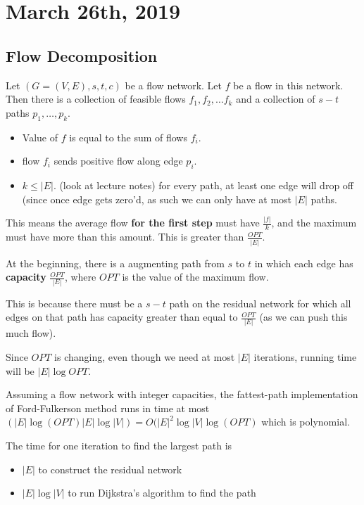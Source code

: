 \documentclass[../main/main.tex]{subfiles}
\begin{document}
\section{March 26th, 2019}
\subsection{Flow Decomposition}

\begin{lemma}
	Let $\left( G=(V,E),s,t,c \right) $ be a flow network. Let $f$ be a flow in this network. Then there is a collection of feasible flows  $f_1,f_2,\ldots f_k$ and a collection of $s-t$ paths $p_1,\ldots,p_k$.
\end{lemma}
\begin{itemize}
	\item Value of $f$ is equal to the sum of flows $f_i$.
	\item flow $f_i$ sends positive flow along edge $p_i$.
	\item  $k\le |E|$. (look at lecture notes) for every path, at least one edge will drop off (since once edge gets zero'd, as such we can only have at most $|E|$ paths.
\end{itemize}

This means the average flow \textbf{for the first step} must have $\frac{|f|}{k}$, and the maximum must have more than this amount. This is greater than $\frac{OPT}{|E|}$.

\begin{corollary}
	\label{begMinEdgeCap}
	At the beginning, there is a augmenting path from $s$ to $t$ in which each edge has \textbf{capacity} $\frac{OPT}{|E|}$, where $OPT$ is the value of the maximum flow.
\end{corollary}

This is because there must be a $s-t$ path on the residual network for which all edges on that path has capacity greater than equal to $\frac{OPT}{|E|}$ (as we can push this much flow). 

Since $OPT$ is changing, even though we need at most $|E|$ iterations, running time will be $|E|\log OPT$.

 \begin{theorem}
	 Assuming a flow network with integer capacities, the fattest-path implementation of Ford-Fulkerson method runs in time at most $\left( |E|\log \left( OPT \right) |E|\log |V| \right)=O(|E|^2\log |V| \log (OPT) $ which is polynomial.
\end{theorem}
The time for one iteration to find the largest path is
\begin{itemize}
	\item $|E|$ to construct the residual network
	\item $|E|\log |V|$ to run Dijkstra's algorithm to find the path 
\end{itemize}
\end{document}
